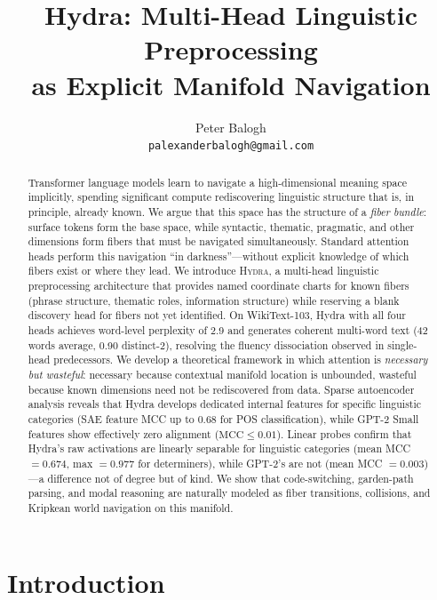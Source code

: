 \documentclass[11pt]{article}
\title{Hydra: Multi-Head Linguistic Preprocessing\\as Explicit Manifold Navigation}
\author{
  Peter Balogh \\
  \texttt{palexanderbalogh@gmail.com}
}
\begin{document}
\maketitle

\begin{abstract}
Transformer language models learn to navigate a high-dimensional meaning space implicitly, 
spending significant compute rediscovering linguistic structure that is, in principle, 
already known. We argue that this space has the structure of a \emph{fiber bundle}: 
surface tokens form the base space, while syntactic, thematic, pragmatic, and other 
dimensions form fibers that must be navigated simultaneously. Standard attention heads 
perform this navigation ``in darkness''---without explicit knowledge of which fibers exist 
or where they lead. We introduce \textsc{Hydra}, a multi-head linguistic preprocessing 
architecture that provides named coordinate charts for known fibers (phrase structure, 
thematic roles, information structure) while reserving a blank discovery head for fibers 
not yet identified. On WikiText-103, Hydra with all four heads achieves word-level 
perplexity of 2.9 and generates coherent multi-word text (42 words average, 0.90 
distinct-2), resolving the fluency dissociation observed in single-head predecessors. 
We develop a theoretical framework in which attention is \emph{necessary but wasteful}: 
necessary because contextual manifold location is unbounded, wasteful because known 
dimensions need not be rediscovered from data. Sparse autoencoder analysis reveals that 
Hydra develops dedicated internal features for specific linguistic categories 
(SAE feature MCC up to 0.68 for POS classification), while GPT-2 Small features 
show effectively zero alignment ($\text{MCC} \leq 0.01$). Linear probes confirm 
that Hydra's raw activations are linearly separable for linguistic categories 
(mean MCC $= 0.674$, max $= 0.977$ for determiners), while GPT-2's are not 
(mean MCC $= 0.003$)---a difference not of degree but of kind. We show that code-switching, 
garden-path parsing, and modal reasoning are naturally modeled as fiber transitions, 
collisions, and Kripkean world navigation on this manifold.
\end{abstract}

\section{Introduction}
\label{sec:intro}
\end{document}
